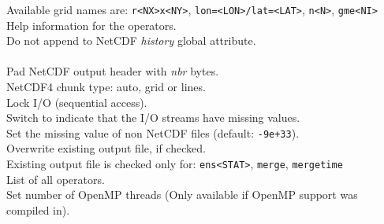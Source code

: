 \begin{tabbing}
         \> Available grid names are: \texttt{r<NX>x<NY>}, \texttt{lon=<LON>/lat=<LAT>}, \texttt{n<N>}, \texttt{gme<NI>} \\
         \> Help information for the operators. \\
         \> Do not append to NetCDF \textit{history} global attribute. \\
         \> \\
\makebox[1.5in][l]{\hspace*{1cm}}
         \> Pad NetCDF output header with \textit{nbr} bytes. \\
         \> NetCDF4 chunk type: auto, grid or lines. \\
         \> Lock I/O (sequential access). \\
         \> Switch to indicate that the I/O streams have missing values. \\
         \> Set the missing value of non NetCDF files (default: \texttt{-9e+33}). \\
         \> Overwrite existing output file, if checked. \\
         \> Existing output file is checked only for: \texttt{ens<STAT>}, \texttt{merge}, \texttt{mergetime} \\
         \> List of all operators. \\
         \> Set number of OpenMP threads (Only available if OpenMP support was compiled in). \\
         \> \\

\end{tabbing}
